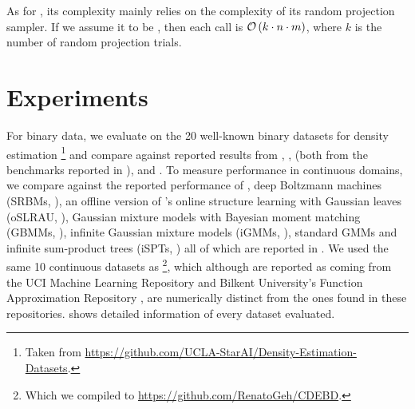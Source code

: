 As for , its complexity mainly relies on the complexity of its random projection
sampler. If we assume it to be , then each  call is
$\mathcal{O}\left(k\cdot n\cdot m\right)$, where $k$ is the number of random projection trials.

\section{Experiments}

For binary data, we evaluate  on the 20 well-known binary datasets for density
estimation \citep{lowd10,haaren12}\footnote{Taken from
\url{https://github.com/UCLA-StarAI/Density-Estimation-Datasets}.} and compare against reported
results from  \citep{gens13}, ,  (both
from the benchmarks reported in \cite{dang20}),  \citep{jaini18a} and
 \citep{dimauro21}. To measure performance in continuous domains, we compare
 against the reported performance of , deep Boltzmann
machines (SRBMs, \cite{salakhutdinov09}), an offline version of \citeauthor{hsu17}'s online
structure learning with Gaussian leaves (oSLRAU, \cite{hsu17}), Gaussian mixture models with
Bayesian moment matching (GBMMs, \cite{jaini16}), infinite Gaussian mixture models (iGMMs,
\cite{rasmussen00}), standard GMMs and infinite sum-product trees (iSPTs, \cite{trapp16}) all of
which are reported in \citet{jaini18a}. We used the same 10 continuous datasets as
\citet{jaini18a}\footnote{Which we compiled to \url{https://github.com/RenatoGeh/CDEBD}.}, which
although are reported as coming from the UCI Machine Learning Repository \citep{dua17} and Bilkent
University's Function Approximation Repository \citep{guvenir00}, are numerically distinct from the
ones found in these repositories.  shows detailed information of every dataset
evaluated.

